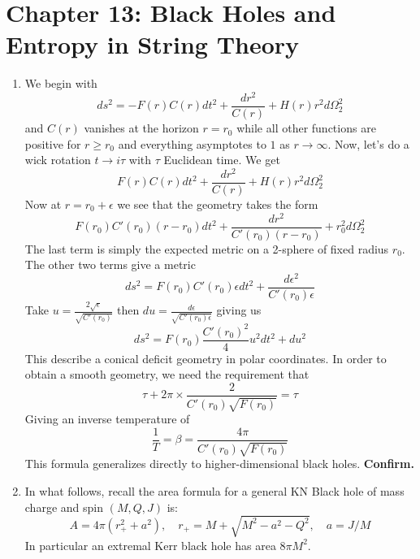 \documentclass[11pt, class=article, crop=false]{standalone}
\begin{document}
\section*{Chapter 13: Black Holes and Entropy in String Theory} %
\label{sec:chapter_13_black_holes_and_entropy_in_string_theory}
\begin{enumerate}
	\item We begin with
	\[
		ds^2 = - F(r) C(r) dt^2 + \frac{dr^2}{C(r)} + H(r) r^2 d\Omega_2^2
	\]
	and $C(r)$ vanishes at the horizon $r = r_0$ while all other functions are positive for $r \geq r_0$ and everything asymptotes to $1$ as $r \to \infty$. Now, let's do a wick rotation $t \to i \tau$ with $\tau$ Euclidean time. We get
	\[
		F(r) C(r) dt^2 + \frac{dr^2}{C(r)} + H(r) r^2 d\Omega_2^2
	\]
	Now at $r = r_0 + \epsilon$ we see that the geometry takes the form
	\[
		F(r_0) C'(r_0) (r-r_0) dt^2 + \frac{dr^2}{C'(r_0) (r-r_0)} + r_0^2 d\Omega_2^2
	\]
	The last term is simply the expected metric on a 2-sphere of fixed radius $r_0$. The other two terms give a metric
	\[
		ds^2 = F(r_0) C'(r_0) \epsilon dt^2 + \frac{d \epsilon^2}{C'(r_0) \epsilon}
	\]
	Take $u = \frac{2 \sqrt{\epsilon}}{\sqrt{C'(r_0)}}$ then $du = \frac{d\epsilon}{\sqrt{C'(r_0) \epsilon}}$ giving us
	\[
		ds^2 = F(r_0) \frac{C'(r_0)^2}{4} u^2 dt^2 + du^2
	\]
	This describe a conical deficit geometry in polar coordinates. In order to obtain a smooth geometry, we need the requirement that 
	\[
		\tau + 2 \pi \times \frac{2}{C'(r_0) \sqrt{F(r_0)}}  = \tau 
	\]
	Giving an inverse temperature of 
	\[
		\frac1T = \beta =  \frac{4 \pi}{C'(r_0) \sqrt{F(r_0)}}
	\]
	This formula generalizes directly to higher-dimensional black holes. \textbf{Confirm.}
	
	\item 
	In what follows, recall the area formula for a general KN Black hole of mass charge and spin $(M, Q, J)$ is:
	\[
		A = 4 \pi (r_+^2 + a^2), \quad r_+ = M + \sqrt{M^2 - a^2 - Q^2}, \quad a = J/M
	\]
	In particular an extremal Kerr black hole has area $8 \pi M^2$. 
	

\end{enumerate}
\end{document}
